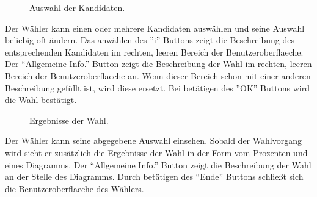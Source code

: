 \documentclass[parskip=full,11pt,twoside]{scrartcl}
\begin{document}
\begin{figure}[H]
	\caption{\label{fig:whlr-wahl}
		Auswahl der Kandidaten.
	}
\end{figure}
Der Wähler kann einen oder mehrere Kandidaten auswählen und seine Auswahl beliebig oft ändern.
Das anwählen des ''i'' Buttons zeigt die Beschreibung des entsprechenden Kandidaten im rechten, leeren Bereich der \gls{Benutzeroberflaeche}.
Der \enquote{Allgemeine Info.} Button zeigt die Beschreibung der Wahl im rechten, leeren Bereich der \gls{Benutzeroberflaeche} an. Wenn dieser Bereich schon mit einer anderen Beschreibung gefüllt ist, wird diese ersetzt.
Bei betätigen des ''OK'' Buttons wird die Wahl bestätigt.


\begin{figure}[H]
	\caption{\label{fig:whlr-result}
		Ergebnisse der Wahl.
	}
\end{figure}
Der Wähler kann seine abgegebene Auswahl einsehen.
Sobald der Wahlvorgang  wird sieht er zusätzlich die Ergebnisse der Wahl in der Form vom Prozenten und eines Diagramms.
Der \enquote{Allgemeine Info.} Button zeigt die Beschreibung der Wahl an der Stelle des Diagramms.
Durch betätigen des \enquote{Ende} Buttons schließt sich die \gls{Benutzeroberflaeche} des Wählers.
\end{document}
